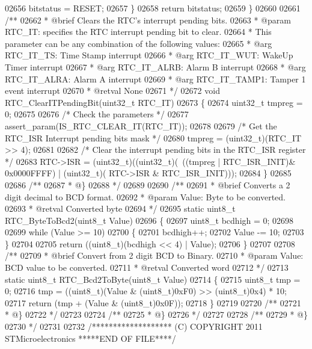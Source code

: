 \begin{DoxyCode}
02656     bitstatus = RESET;
02657   \}
02658   \textcolor{keywordflow}{return} bitstatus;
02659 \}
02660 
02661 \textcolor{comment}{/**}
02662 \textcolor{comment}{  * @brief  Clears the RTC's interrupt pending bits.}
02663 \textcolor{comment}{  * @param  RTC\_IT: specifies the RTC interrupt pending bit to clear.}
02664 \textcolor{comment}{  *          This parameter can be any combination of the following values:}
02665 \textcolor{comment}{  *            @arg RTC\_IT\_TS: Time Stamp interrupt }
02666 \textcolor{comment}{  *            @arg RTC\_IT\_WUT: WakeUp Timer interrupt }
02667 \textcolor{comment}{  *            @arg RTC\_IT\_ALRB: Alarm B interrupt }
02668 \textcolor{comment}{  *            @arg RTC\_IT\_ALRA: Alarm A interrupt }
02669 \textcolor{comment}{  *            @arg RTC\_IT\_TAMP1: Tamper 1 event interrupt }
02670 \textcolor{comment}{  * @retval None}
02671 \textcolor{comment}{  */}
02672 \textcolor{keywordtype}{void} RTC_ClearITPendingBit(uint32\_t RTC\_IT)
02673 \{
02674   uint32\_t tmpreg = 0;
02675 
02676   \textcolor{comment}{/* Check the parameters */}
02677   assert_param(IS\_RTC\_CLEAR\_IT(RTC\_IT));
02678 
02679   \textcolor{comment}{/* Get the RTC\_ISR Interrupt pending bits mask */}
02680   tmpreg = (uint32\_t)(RTC\_IT >> 4);
02681 
02682   \textcolor{comment}{/* Clear the interrupt pending bits in the RTC\_ISR register */}
02683   RTC->ISR = (uint32\_t)((uint32\_t)(~((tmpreg | RTC_ISR_INIT)& 0x0000FFFF) | (uint32\_t)(
      RTC->ISR & RTC_ISR_INIT)));
02684 \}
02685 
02686 \textcolor{comment}{/**}
02687 \textcolor{comment}{  * @\}}
02688 \textcolor{comment}{  */}
02689 
02690 \textcolor{comment}{/**}
02691 \textcolor{comment}{  * @brief  Converts a 2 digit decimal to BCD format.}
02692 \textcolor{comment}{  * @param  Value: Byte to be converted.}
02693 \textcolor{comment}{  * @retval Converted byte}
02694 \textcolor{comment}{  */}
02695 \textcolor{keyword}{static} uint8\_t RTC_ByteToBcd2(uint8\_t Value)
02696 \{
02697   uint8\_t bcdhigh = 0;
02698 
02699   \textcolor{keywordflow}{while} (Value >= 10)
02700   \{
02701     bcdhigh++;
02702     Value -= 10;
02703   \}
02704 
02705   \textcolor{keywordflow}{return}  ((uint8\_t)(bcdhigh << 4) | Value);
02706 \}
02707 
02708 \textcolor{comment}{/**}
02709 \textcolor{comment}{  * @brief  Convert from 2 digit BCD to Binary.}
02710 \textcolor{comment}{  * @param  Value: BCD value to be converted.}
02711 \textcolor{comment}{  * @retval Converted word}
02712 \textcolor{comment}{  */}
02713 \textcolor{keyword}{static} uint8\_t RTC_Bcd2ToByte(uint8\_t Value)
02714 \{
02715   uint8\_t tmp = 0;
02716   tmp = ((uint8\_t)(Value & (uint8\_t)0xF0) >> (uint8\_t)0x4) * 10;
02717   \textcolor{keywordflow}{return} (tmp + (Value & (uint8\_t)0x0F));
02718 \}
02719 
02720 \textcolor{comment}{/**}
02721 \textcolor{comment}{  * @\}}
02722 \textcolor{comment}{  */}
02723 
02724 \textcolor{comment}{/**}
02725 \textcolor{comment}{  * @\}}
02726 \textcolor{comment}{  */}
02727 
02728 \textcolor{comment}{/**}
02729 \textcolor{comment}{  * @\}}
02730 \textcolor{comment}{  */}
02731 
02732 \textcolor{comment}{/******************* (C) COPYRIGHT 2011 STMicroelectronics *****END OF FILE****/}
\end{DoxyCode}
